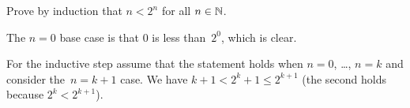 \documentclass{ibl}  %
\begin{document}
\begin{problem}
\end{problem}

\begin{problem}
Prove by induction that $n<2^n$ for all $n\in\mathbb{N}$.  
\begin{ans}
The $n=0$ base case is that $0$ is less than~$2^0$, which is clear.

For the inductive step assume that the statement holds when 
$n=0$, \ldots, $n=k$ and consider the~$n=k+1$ case.
We have $k+1<2^k+1\leq 2^{k+1}$ (the second holds because $2^k<2^{k+1}$). 
\end{ans}
\end{problem}
\end{document}
